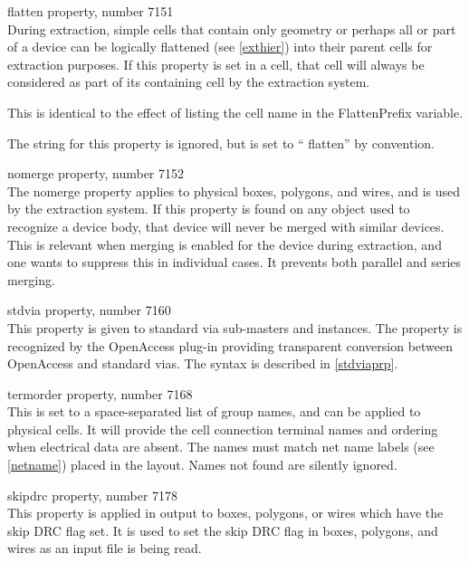 \begin{description}
\item{\et flatten} property, number 7151\\
During extraction, simple cells that contain only geometry or perhaps
all or part of a device can be logically flattened (see \ref{exthier})
into their parent cells for extraction purposes.  If this property is
set in a cell, that cell will always be considered as part of its
containing cell by the extraction system.

This is identical to the effect of listing the cell name in the {\et
FlattenPrefix} variable.

The string for this property is ignored, but is set to ``{\vt
flatten}'' by convention.

\item{\et nomerge} property, number 7152\\
The {\et nomerge} property applies to physical boxes, polygons, and
wires, and is used by the extraction system.  If this property is
found on any object used to recognize a device body, that device will
never be merged with similar devices.  This is relevant when merging
is enabled for the device during extraction, and one wants to suppress
this in individual cases.  It prevents both parallel and series
merging.

\item{\et stdvia} property, number 7160\\
This property is given to standard via sub-masters and instances.
The property is recognized by the OpenAccess plug-in providing
transparent conversion between OpenAccess and {\Xic} standard vias.
The syntax is described in \ref{stdviaprp}.

\item{\et termorder} property, number 7168\\
This is set to a space-separated list of group names, and can be
applied to physical cells.  It will provide the cell connection
terminal names and ordering when electrical data are absent.  The
names must match net name labels (see \ref{netname}) placed in the
layout.  Names not found are silently ignored.

\item{\et skipdrc} property, number 7178\\
This property is applied in output to boxes, polygons, or wires which
have the {\cb skip DRC} flag set.  It is used to set the {\cb skip
DRC} flag in boxes, polygons, and wires as an input file is being
read.


\end{description}
